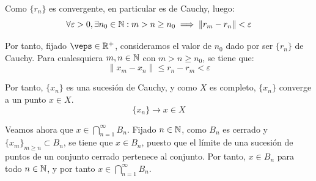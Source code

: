 \begin{ejercicio}
Como $\{r_n\}$ es convergente, en particular es de Cauchy, luego:
\begin{equation*}
    \forall \varepsilon > 0, \exists n_0 \in \mathbb{N} : m> n \geq n_0 \implies \|r_m - r_n\| < \varepsilon
\end{equation*}

Por tanto, fijado $\veps\in \bb{R}^+$, consideramos el valor de $n_0$ dado por ser $\{r_n\}$ de Cauchy. Para cualesquiera $m, n \in \mathbb{N}$ con $m > n \geq n_0$, se tiene que:
\begin{equation*}
    \|x_m - x_n\| \leq r_n - r_m < \varepsilon
\end{equation*}

Por tanto, $\{x_n\}$ es una sucesión de Cauchy, y como $X$ es completo, $\{x_n\}$ converge a un punto $x \in X$.
\begin{equation*}
    \{x_n\} \longrightarrow x \in X
\end{equation*}

Veamos ahora que $x \in \bigcap\limits_{n=1}^\infty B_n$. Fijado $n \in \mathbb{N}$, como $B_n$ es cerrado y $\{x_m\}_{m\geq n} \subset B_n$, se tiene que $x \in B_n$, puesto que el límite de una sucesión de puntos de un conjunto cerrado pertenece al conjunto. Por tanto, $x \in B_n$ para todo $n \in \mathbb{N}$, y por tanto $x \in \bigcap\limits_{n=1}^\infty B_n$.
\end{ejercicio}

